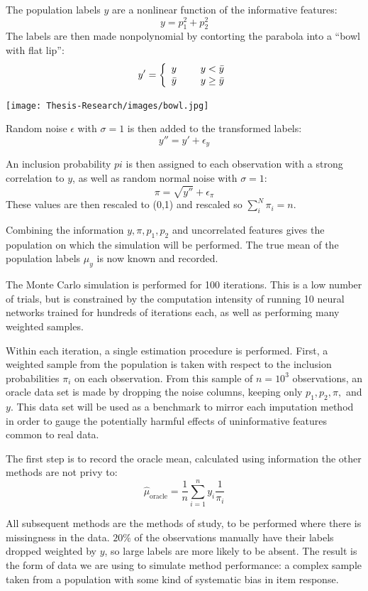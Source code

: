 \documentclass[12pt,twoside]{reedthesis}
\begin{document}
The population labels \(y\) are a nonlinear function of the informative
features: \[
y = p_1^2 + p_2^2
\] The labels are then made nonpolynomial by contorting the parabola
into a ``bowl with flat lip'': \[
y' = \left\{ \begin{array}{cc} 
                y & \hspace{5mm} y<\bar{y} \\
                \bar{y} & \hspace{5mm} y \geq \bar{y} \\
                \end{array} \right.
\]

\texttt{[image: Thesis-Research/images/bowl.jpg]}

Random noise \(\epsilon\) with \(\sigma = 1\) is then added to the
transformed labels: \[
y'' = y' + \epsilon_y
\]

An inclusion probability \(pi\) is then assigned to each observation
with a strong correlation to \(y\), as well as random normal noise with
\(\sigma = 1\): \[
\pi = \sqrt{y''} + \epsilon_\pi
\] These values are then rescaled to (0,1) and rescaled so
\(\sum_i^N \pi_i = n\).

Combining the information \(y,\pi, p_1, p_2\) and uncorrelated features
gives the population on which the simulation will be performed. The true
mean of the population labels \(\mu_y\) is now known and recorded.

The Monte Carlo simulation is performed for 100 iterations. This is a
low number of trials, but is constrained by the computation intensity of
running 10 neural networks trained for hundreds of iterations each, as
well as performing many weighted samples.

Within each iteration, a single estimation procedure is performed.
First, a weighted sample from the population is taken with respect to
the inclusion probabilities \(\pi_i\) on each observation. From this
sample of \(n=10^3\) observations, an oracle data set is made by
dropping the noise columns, keeping only \(p_1, p_2, \pi,\) and \(y\).
This data set will be used as a benchmark to mirror each imputation
method in order to gauge the potentially harmful effects of
uninformative features common to real data.

The first step is to record the oracle mean, calculated using
information the other methods are not privy to: \[
\hat \mu_{\text{oracle}} = \frac{1}{n} \sum_{i=1}^n y_i \frac{1}{\pi_i}
\]

All subsequent methods are the methods of study, to be performed where
there is missingness in the data. \(20\%\) of the observations manually
have their labels dropped weighted by \(y\), so large labels are more
likely to be absent. The result is the form of data we are using to
simulate method performance: a complex sample taken from a population
with some kind of systematic bias in item response.
\end{document}
